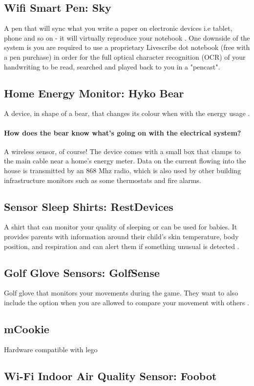 \documentclass[12pt]{article}
\begin{document}
\subsection {Wifi Smart Pen: Sky}
A pen that will sync what you write a paper on electronic devices i.e tablet, phone and so on - it will virtually reproduce your notebook \cite {pen}.  One downside of the system is you are required to use a proprietary Livescribe dot notebook (free with a pen purchase) in order for the full optical character recognition (OCR) of your handwriting to be read, searched and played back to you in a "pencast".
\subsection {Home Energy Monitor: Hyko Bear} A device, in shape of a bear, that changes its colour when with the energy usage \cite{bear}. 

\paragraph {How does the bear know what’s going on with the electrical system?} A wireless sensor, of course! The device comes with a small box that clamps to the main cable near a home’s energy meter. Data on the current flowing into the house is transmitted by an 868 Mhz radio, which is also used by other building infrastructure monitors such as some thermostats and fire alarms.
\subsection {Sensor Sleep Shirts: RestDevices} A shirt that can monitor your quality of sleeping or can be used for babies. It provides parents with information around their child's skin temperature, body position, and respiration and can alert them if something unusual is detected \cite{shirt}.
\subsection {Golf Glove Sensors: GolfSense}  Golf glove that monitors your movements during the game. They want to also include the option when you are allowed to compare your movement with others \cite{golf}. 

\subsection {mCookie} Hardware compatible with lego \cite{lego}
\subsection {Wi-Fi Indoor Air Quality Sensor: Foobot}
\end{document}
